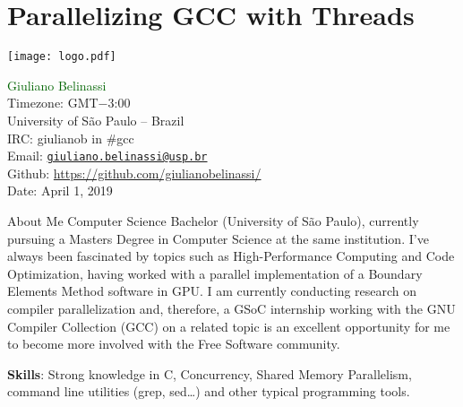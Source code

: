 \chapter{Parallelizing GCC with Threads}
\label{ap:gsoc}


\begin{center}
\Huge \bf
\vspace{0.5cm}
\end{center}
\vspace*{\fill}
{
     \centering
     \texttt{[image: logo.pdf]}
    \par
}
\vspace*{\fill}
\normalsize{
\noindent\textcolor{darkgreen}{Giuliano Belinassi} \\
Timezone: GMT$-$3:00 \\
University of São Paulo -- Brazil \\
IRC: giulianob in \#gcc \\
Email: \href{mailto:giuliano.belinassi@usp.br}{\texttt{giuliano.belinassi@usp.br}} \\
Github: \url{https://github.com/giulianobelinassi/} \\
Date: April 1, 2019
}
\newpage

\begin{section}{About Me}
    Computer Science Bachelor (University of São Paulo), 
    currently pursuing a Masters Degree in Computer Science at the same
    institution. I've always been fascinated by topics such as
    High-Performance Computing and Code Optimization, having worked with
    a parallel implementation of a Boundary Elements Method software in GPU.
    I am currently conducting research on compiler parallelization and,
    therefore, a GSoC internship working with the GNU
    Compiler Collection (GCC) on a related topic is an excellent opportunity
    for me to become more involved with the Free Software community.

    \textbf{Skills}: Strong knowledge in C, Concurrency, Shared Memory Parallelism, command line utilities (grep, sed\dots) and other typical programming tools.
\end{section}

